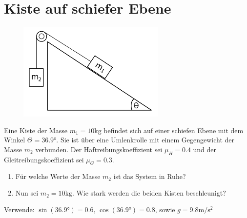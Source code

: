 \section{Kiste auf schiefer Ebene}
\begin{figure}
   \centering
   \includegraphics[width=0.65\textwidth]{aufg1.pdf}
   \label{fig: aufg1}
 \end{figure}
Eine Kiste der Masse $m_1 = 10 \si{\kilo\gram}$ befindet sich auf einer schiefen Ebene mit dem Winkel $\Theta = 36.9\si{\degree}$.
Sie ist über eine Umlenkrolle mit einem Gegengewicht der Masse $m_2$ verbunden. Der Haftreibungskoeffizient sei $\mu_H = 0.4$ und
der Gleitreibungskoeffizient sei $\mu_G = 0.3$.
  \begin{enumerate}[label=\roman*]
    \item Für welche Werte der Masse $m_2$ ist das System in Ruhe?
    \item Nun sei $m_2 = 10\si{\kilo\gram}$. Wie stark werden die beiden Kisten beschleunigt?
  \end{enumerate}
Verwende: $\sin\left(36.9\si{\degree}\right) = 0.6,\, \cos\left(36.9\si{\degree}\right) = 0.8$, sowie $g = 9.8 \si{\meter \per \second^2}$

\newpage
